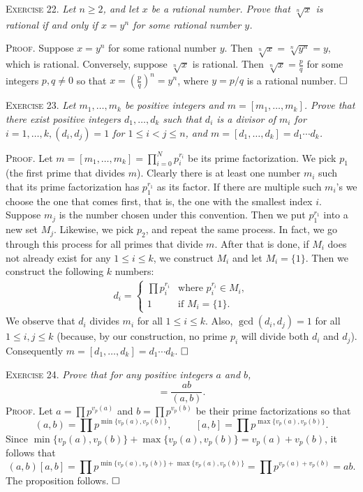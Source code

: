 \documentclass[11pt, leqno]{article}
\newcommand{\done}{\ensuremath{\hfill\square}}
\begin{document}
\textsc{Exercise 22}. \emph{Let $n\geq 2$, and let $x$ be a rational number. Prove that $\sqrt[n]{x}$ is rational if and only if $x = y^n$ for some rational number $y$.}

\textsc{Proof}. Suppose $x=y^n$ for some rational number $y$. Then $\sqrt[n]{x} = \sqrt[n]{y^n} = y$, which is rational. Conversely, suppose $\sqrt[n]{x}$ is rational. Then $\sqrt[n]{x} = \frac{p}{q}$ for some integers $p, q \ne 0$ so that $x = (\frac{p}{q})^n = y^n$, where $y = p/q$ is a rational number. \done

\textsc{Exercise 23}. \emph{Let $m_1, \ldots, m_k$ be positive integers and $m = [m_1, \ldots, m_k]$. Prove that there exist positive integers $d_1, \ldots, d_k$ such that $d_i$ is a divisor of $m_i$ for $i=1, \ldots, k, (d_i, d_j) = 1$ for $1 \leq i < j \leq n$, and $m = [d_1, \ldots, d_k] = d_1\cdots d_k$.}

\textsc{Proof}. Let $m = [m_1, \ldots, m_k] = \prod_{i=0}^N p_i^{r_i}$ be its prime factorization. We pick $p_1$ (the first prime that divides $m$). Clearly there is at least one number $m_i$ such that its prime factorization has $p_1^{r_1}$ as its factor. If there are multiple such $m_i$'s we choose the one that comes first, that is, the one with the smallest index $i$. Suppose $m_j$ is the number chosen under this convention. Then we put $p_1^{r_1}$ into a new set $M_j$. Likewise, we pick $p_2$, and repeat the same process. In fact, we go through this process for all primes that divide $m$. After that is done, if $M_i$ does not already exist for any $1 \leq i \leq k$, we construct $M_i$ and let $M_i = \{1\}$. Then we construct the following $k$ numbers:
\begin{align*}
  d_i =
  \begin{cases}
    \prod p_i^{r_i} & \text{where } p_i^{r_i} \in M_i, \\
    1 & \text{if } M_i=\{1\}.
  \end{cases}
\end{align*}
We observe that $d_i$ divides $m_i$ for all $1 \leq i \leq k$. Also, $\gcd(d_i, d_j) = 1$ for all $1 \leq i,j \leq k$ (because, by our construction, no prime $p_i$ will divide both $d_i$ and $d_j$). Consequently $ m = [d_1, \ldots, d_k] = d_1\cdots d_k$. \done

\textsc{Exercise 24}. \emph{Prove that for any positive integers $a$ and $b$, 
\begin{displaymath}
[a,b] = \frac{ab}{(a,b)}.
\end{displaymath}}\textsc{Proof}. Let $a = \prod p^{v_p(a)}$ and $b = \prod p^{v_p(b)}$ be their prime factorizations so that 
\begin{displaymath}
(a, b) = \prod p^{\min\{v_p(a), v_p(b)\}}, \hspace{1cm} [a,b] = \prod p^{\max\{v_p(a), v_p(b)\}}.
\end{displaymath}
Since $\min\{v_p(a), v_p(b)\} + \max\{v_p(a), v_p(b)\} = v_p(a) + v_p(b)$, it follows that 
\begin{displaymath}
(a, b)[a, b] = \prod p^{\min\{v_p(a), v_p(b)\} + \max\{v_p(a), v_p(b)\}} = \prod p^{v_p(a) + v_p(b)} = ab.
\end{displaymath}
The proposition follows. \done
\end{document}
